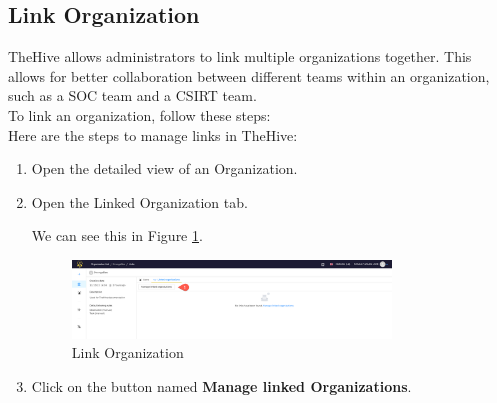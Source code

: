 \documentclass{article}
\begin{document}
\subsection{Link Organization}

TheHive allows administrators to link multiple organizations together. This allows for better collaboration between different teams within an organization, such as a SOC team and a CSIRT team.\\
To link an organization, follow these steps: \\

Here are the steps to manage links in TheHive:
\begin{enumerate}
    \item Open the detailed view of an Organization.
    \item Open the Linked Organization tab.



We can see this in Figure \ref{fig:link}.

\begin{figure}[H]
    \centering
    \includegraphics[width=0.8\textwidth]{organisation-links1.png}
    \caption{Link Organization}
    \label{fig:link}
\end{figure}
    \item  Click on the button named \textbf{Manage linked Organizations}.



\end{enumerate}
\end{document}
